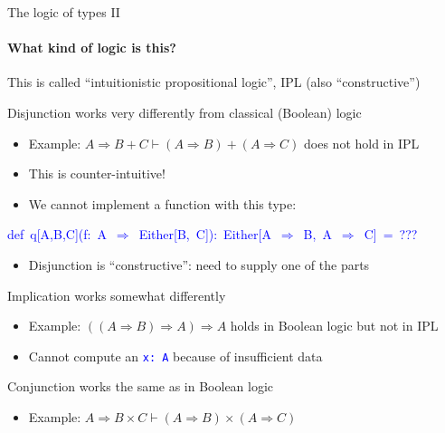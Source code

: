 \documentclass[english]{beamer}
\newenvironment{lyxcode}
   {\par\begin{list}{}{
     \setlength{\rightmargin}{\leftmargin}
     \setlength{\listparindent}{0pt}%
     \raggedright
     \setlength{\itemsep}{0pt}
     \setlength{\parsep}{0pt}
     \normalfont\ttfamily}%
    \def\{{\char`\{}
    \def\}{\char`\}}
    \def\textasciitilde{\char`\~}
    \item[]}
   {\end{list}}
\begin{document}
\begin{frame}{The logic of types II}


\framesubtitle{What kind of logic is this?}

This is called ``intuitionistic propositional logic'', IPL (also
``constructive'')
\begin{itemize}
\item Disjunction works very differently from classical (Boolean) logic
\begin{itemize}
\item Example: $A\Rightarrow B+C\vdash(A\Rightarrow B)+(A\Rightarrow C)$
does not hold in IPL
\item This is counter-intuitive!
\item We cannot implement a function with this type:
\end{itemize}
\begin{lyxcode}
\textcolor{blue}{\footnotesize{}def~q{[}A,B,C{]}(f:~A~$\Rightarrow$~Either{[}B,~C{]}):~Either{[}A~$\Rightarrow$~B,~A~$\Rightarrow$~C{]}~=~???}{\footnotesize \par}
\end{lyxcode}
\begin{itemize}
\item Disjunction is ``constructive'': need to supply one of the parts
\end{itemize}
\item Implication works somewhat differently
\begin{itemize}
\item Example: $\left(\left(A\Rightarrow B\right)\Rightarrow A\right)\Rightarrow A$
holds in Boolean logic but not in IPL
\item Cannot compute an \texttt{\textcolor{blue}{\footnotesize{}x:\ A}}
because of insufficient data
\end{itemize}
\item Conjunction works the same as in Boolean logic
\begin{itemize}
\item Example: $A\Rightarrow B\times C\vdash\left(A\Rightarrow B\right)\times\left(A\Rightarrow C\right)$ 
\end{itemize}
\end{itemize}
\end{frame}
\end{document}
